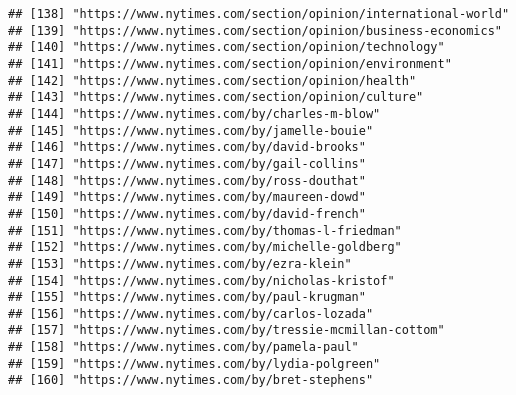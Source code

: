 \documentclass[
]{article}
\begin{document}
\begin{verbatim}
## [138] "https://www.nytimes.com/section/opinion/international-world"                                               
## [139] "https://www.nytimes.com/section/opinion/business-economics"                                                
## [140] "https://www.nytimes.com/section/opinion/technology"                                                        
## [141] "https://www.nytimes.com/section/opinion/environment"                                                       
## [142] "https://www.nytimes.com/section/opinion/health"                                                            
## [143] "https://www.nytimes.com/section/opinion/culture"                                                           
## [144] "https://www.nytimes.com/by/charles-m-blow"                                                                 
## [145] "https://www.nytimes.com/by/jamelle-bouie"                                                                  
## [146] "https://www.nytimes.com/by/david-brooks"                                                                   
## [147] "https://www.nytimes.com/by/gail-collins"                                                                   
## [148] "https://www.nytimes.com/by/ross-douthat"                                                                   
## [149] "https://www.nytimes.com/by/maureen-dowd"                                                                   
## [150] "https://www.nytimes.com/by/david-french"                                                                   
## [151] "https://www.nytimes.com/by/thomas-l-friedman"                                                              
## [152] "https://www.nytimes.com/by/michelle-goldberg"                                                              
## [153] "https://www.nytimes.com/by/ezra-klein"                                                                     
## [154] "https://www.nytimes.com/by/nicholas-kristof"                                                               
## [155] "https://www.nytimes.com/by/paul-krugman"                                                                   
## [156] "https://www.nytimes.com/by/carlos-lozada"                                                                  
## [157] "https://www.nytimes.com/by/tressie-mcmillan-cottom"                                                        
## [158] "https://www.nytimes.com/by/pamela-paul"                                                                    
## [159] "https://www.nytimes.com/by/lydia-polgreen"                                                                 
## [160] "https://www.nytimes.com/by/bret-stephens"                                                                  

\end{verbatim}
\end{document}

